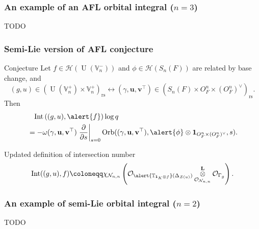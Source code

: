 \documentclass[11pt]{beamer}
\DeclareMathOperator{\Int}{Int}
\DeclareMathOperator{\Orb}{Orb}
\DeclareMathOperator{\U}{U}
\newcommand{\HH}{\mathcal{H}}
\newcommand{\VV}{\mathbb{V}}
\newcommand{\TT}{\mathbb{T}}
\renewcommand{\OO}{O}
\newcommand{\RZ}{\mathcal{N}}
\newcommand{\Sheaf}{\mathcal O}
\newcommand{\ZD}{\mathcal{Z}}
\newcommand{\guv}{{(\gamma, \uu, \vv^\top)}}
\newcommand{\jiao}{\mathop{\otimes}^{\mathbf{L}}} %
\newcommand{\oneV}{\mathbf{1}_{\OO_F^n \times (\OO_F^n)^\vee}}
\newcommand{\rs}{_{\text{rs}}}
\newcommand{\uu}{\mathbf{u}}
\newcommand{\vv}{\mathbf{v}}
\begin{document}
\begin{frame}
  \frametitle{An example of an AFL orbital integral ($n=3$)}
  TODO
\end{frame}

\begin{frame}
  \frametitle{Semi-Lie version of AFL conjecture}
  \begin{exampleblock}{Conjecture}
    Let \alert{$f \in \HH(\U(\VV_n^-))$} and \alert{$\phi \in \HH(S_n(F))$}
    are \alert{related by base change}, and
    \[ (g, u) \in (\U(\VV_n^+) \times \VV_n^+)\rs \longleftrightarrow
    (\gamma, \uu, \vv^\top) \in (S_n(F) \times \OO_F^n \times (\OO_F^n)^\vee)\rs. \]
    Then
    \begin{align*}
      &\phantom= \Int\left( (g,u), \alert{f} \right) \log q \\
      &= -\omega\guv \left. \pdv{}{s} \right\rvert_{s=0}
      \Orb(\guv, \alert{\phi} \otimes \oneV, s).
    \end{align*}
  \end{exampleblock}
  \begin{block}{Updated definition of intersection number}
    \[
      \Int((g,u), f)
      \coloneqq \chi_{\RZ_{n,n}} \left(
      \Sheaf_{\alert{\TT_{\mathbf{1}_K \otimes f}}(\Delta_{\ZD(u)})}
      \jiao_{\Sheaf_{\RZ_{n,n}}} \Sheaf_{\Gamma_g} \right).
    \]
  \end{block}
\end{frame}

\begin{frame}
  \frametitle{An example of semi-Lie orbital integral ($n=2$)}
  TODO
\end{frame}
\end{document}
